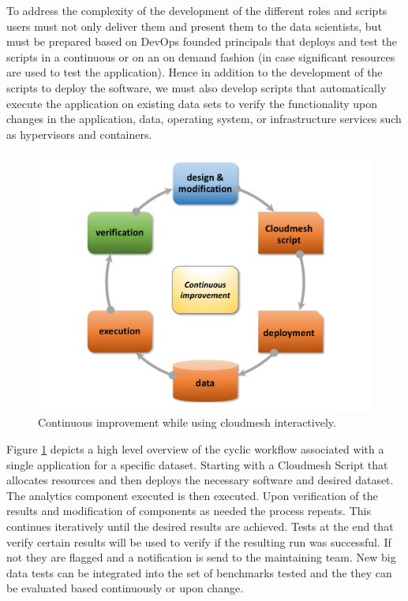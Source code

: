 \documentclass[9pt,twocolumn,twoside]{styles/osajnl}
\begin{document}
To address the complexity of the development of the different roles
and scripts users must not only deliver them and present them to the
data scientists, but must be prepared based on DevOps founded
principals that deploys and test the scripts in a continuous or on an
on demand fashion (in case significant resources are used to test the
application). Hence in addition to the development of the scripts to
deploy the software, we must also develop scripts that automatically
execute the application on existing data sets to verify the
functionality upon changes in the application, data, operating system,
or infrastructure services such as hypervisors and containers.


\begin{figure}[htb]
  \centering
      \includegraphics[width=1.0\columnwidth]{images/nist-devops-1.pdf}
  \caption{Continuous improvement while using cloudmesh interactively.}
  \label{F:NIST-devops-1}
\end{figure}


Figure \ref{F:NIST-devops-1} depicts a high level overview of the cyclic workflow
associated with a single application for a specific dataset. Starting
with a Cloudmesh Script that allocates resources and then deploys the
necessary software and desired dataset. The analytics component
executed is then executed. Upon verification of the results and
modification of components as needed the process repeats. This
continues iteratively until the desired results are achieved. Tests at
the end that verify certain results will be used to verify if the
resulting run was successful. If not they are flagged and a
notification is send to the maintaining team. New big data tests can
be integrated into the set of benchmarks tested and the they can be
evaluated based continuously or upon change.
\end{document}
